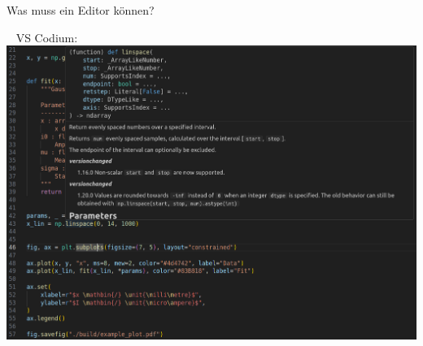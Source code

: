 \begin{frame}{Was muss ein Editor können?}
\begin{minipage}{0.22\textwidth}
    \vspace{.5\textheight}
  \end{minipage}
  \pause
  \begin{minipage}{0.3\textwidth}
    ~
    \vspace{.32\textheight}
    \flushright VS Codium: \flushleft \vspace{-1.5em}
    \includegraphics[height=0.52\textheight]{figures/vscodium_example_screenshot.png}
  \end{minipage}
\end{frame}

